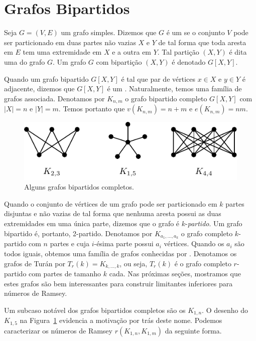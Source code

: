 \section{Grafos Bipartidos}

Seja $G = (V,E)$ um grafo simples. Dizemos que $G$ é um  se o conjunto $V$ pode ser particionado em duas partes não vazias $X$ e $Y$ de tal forma que toda aresta em $E$ tem uma extremidade em $X$ e a outra em $Y$. Tal partição $(X,Y)$ é dita uma  do grafo $G$. Um grafo $G$ com bipartição $(X,Y)$ é denotado $G[X,Y]$.

Quando um grafo bipartido $G[X,Y]$ é tal que par de vértices $x \in X$ e $y \in Y$ é adjacente, dizemos que $G[X,Y]$ é um . Naturalmente, temos uma família de grafos associada. Denotamos por $K_{n,m}$ o grafo bipartido completo $G[X,Y]$ com $|X| = n$ e $|Y| = m$. Temos portanto que $v(K_{n,m}) = n + m$ e $e(K_{n,m}) = nm$.

\begin{figure}[ht!]
\centering
\includegraphics{figures/3_graph_1_part}
\caption{Alguns grafos bipartidos completos.}
\label{graph:fig:part}
\end{figure}

Quando o conjunto de vértices de um grafo pode ser particionado em $k$ partes disjuntas e não vazias de tal forma que nenhuma aresta possui as duas extremidades em uma única parte, dizemos que o grafo é $k$-\emph{partido}. Um grafo bipartido é, portanto, 2-partido. Denotamos por $K_{a_1, \dots, a_k}$ o grafo completo $k$-partido com $n$ partes e cuja $i$-ésima parte possui $a_i$ vértices. Quando os $a_i$ são todos iguais, obtemos uma família de grafos conhecidas por . Denotamos os grafos de Turán por $T_r(k) = K_{k, \dots, k}$, ou seja, $T_r(k)$ é o grafo completo $r$-partido com partes de tamanho $k$ cada. Nas próximas seções, mostramos que estes grafos são bem interessantes para construir limitantes inferiores para números de Ramsey.

Um subcaso notável dos grafos bipartidos completos são os  $K_{1,n}$. O desenho do $K_{1,5}$ na Figura~\ref{graph:fig:part} evidencia a motivação por trás deste nome. Podemos caracterizar os números de Ramsey $r(K_{1,n}, K_{1,m})$ da seguinte forma.

